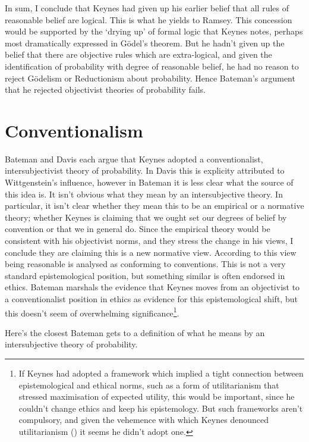 \documentclass[
  11pt,
  letterpaper,
  DIV=11,
  numbers=noendperiod,
  twoside]{scrartcl}
\begin{document}
In sum, I conclude that Keynes had given up his earlier belief that all
rules of reasonable belief are logical. This is what he yields to
Ramsey. This concession would be supported by the `drying up' of formal
logic that Keynes notes, perhaps most dramatically expressed in Gödel's
theorem. But he hadn't given up the belief that there are objective
rules which are extra-logical, and given the identification of
probability with degree of reasonable belief, he had no reason to reject
Gödelism or Reductionism about probability. Hence Bateman's argument
that he rejected objectivist theories of probability fails.

\section{Conventionalism}\label{conventionalism}

Bateman and Davis each argue that Keynes adopted a conventionalist,
intersubjectivist theory of probability. In Davis this is explicity
attributed to Wittgenstein's influence, however in Bateman it is less
clear what the source of this idea is. It isn't obvious what they mean
by an intersubjective theory. In particular, it isn't clear whether they
mean this to be an empirical or a normative theory; whether Keynes is
claiming that we ought set our degrees of belief by convention or that
we in general do. Since the empirical theory would be consistent with
his objectivist norms, and they stress the change in his views, I
conclude they are claiming this is a new normative view. According to
this view being reasonable is analysed as conforming to conventions.
This is not a very standard epistemological position, but something
similar is often endorsed in ethics. Bateman marshals the evidence that
Keynes moves from an objectivist to a conventionalist position in ethics
as evidence for this epistemological shift, but this doesn't seem of
overwhelming significance\footnote{If Keynes had adopted a framework
  which implied a tight connection between epistemological and ethical
  norms, such as a form of utilitarianism that stressed maximisation of
  expected utility, this would be important, since he couldn't change
  ethics and keep his epistemology. But such frameworks aren't
  compulsory, and given the vehemence with which Keynes denounced
  utilitarianism () it seems
  he didn't adopt one.}.

Here's the closest Bateman gets to a definition of what he means by an
intersubjective theory of probability.
\end{document}
